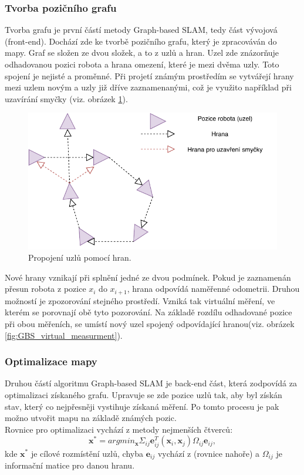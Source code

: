 \documentclass[12pt]{report}
\begin{document}
\subsubsection{Tvorba pozičního grafu}
Tvorba grafu je první částí metody Graph-based SLAM, tedy část vývojová (front-end). Dochází zde ke tvorbě pozičního grafu, který je zpracováván do mapy. Graf se složen ze dvou složek, a to z uzlů a hran. Uzel zde znázorňuje odhadovanou pozici robota a hrana omezení, které je mezi dvěma uzly. Toto spojení je nejisté a proměnné. Při projetí známým prostředím se vytvářejí hrany mezi uzlem novým a uzly již dříve zaznamenanými, což je využito například při uzavírání smyčky (viz. obrázek \ref{fig:GBS_constrains}).\\
\begin{figure}[!ht]
	\begin{center}
		\includegraphics[width=0.6\columnwidth]{imgs/GBS_constrains.pdf}
	\end{center}
	\caption{Propojení uzlů pomocí hran.}
	\label{fig:GBS_constrains}
\end{figure}

\indent Nové hrany vznikají při splnění jedné ze dvou podmínek. Pokud je zaznamenán přesun robota z pozice $x_i$ do $x_{i+1}$, hrana odpovídá naměřenné odometrii. Druhou možností je zpozorování stejného prostředí. Vzniká tak virtuální měření, ve kterém se porovnají obě tyto pozorování. Na základě rozdílu odhadované pozice při obou měřeních, se umístí nový uzel spojený odpovídající hranou(viz. obrázek \ref{fig:GBS_virtual_measurment}). 


\subsubsection{Optimalizace mapy}
Druhou částí algoritmu Graph-based SLAM je back-end část, která zodpovídá za optimalizaci získaného grafu. Upravuje se zde pozice uzlů tak, aby byl získán stav, který co nejpřesněji vystihuje získaná měření. Po tomto procesu je pak možno utvořit mapu na základě známých pozic.\\
\indent Rovnice pro optimalizaci vychází z metody nejmenších čtverců:
\begin{equation}
	\textbf{x}^*=argmin_{\textbf{x}}\Sigma_{ij}\textbf{e}_{ij}^T(\textbf{x}_i,\textbf{x}_j)\Omega_{ij}\textbf{e}_{ij},
\end{equation}
kde $\textbf{x}^*$ je cílové rozmístění uzlů, chyba $\textbf{e}_{ij}$ vychází z (rovnice nahoře) a $\Omega_{ij}$ je informační matice pro danou hranu. 
\end{document}
